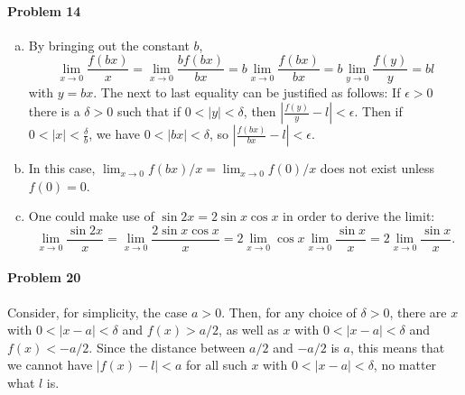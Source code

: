 \documentclass{article}
\begin{document}
\paragraph{Problem 14}
\begin{enumerate}[(a)]
  \item By bringing out the constant $b$, \[
      \lim_{x \to 0} \frac{f(bx)}{x}
      = \lim_{x \to 0} \frac{bf(bx)}{bx}
      = b \lim_{x \to 0} \frac{f(bx)}{bx}
      = b \lim_{y \to 0} \frac{f(y)}{y}
      = bl
    \] with $y = bx$. The next to last equality can be justified as follows: If
    $\epsilon > 0$ there is a $\delta > 0$ such that if $0 < |y| < \delta$,
    then $\left| \frac{f(y)}{y} - l \right| < \epsilon$. Then if $0 < |x| <
    \frac{\delta}{b}$, we have $0 < |bx| < \delta$, so $\left| \frac{f(bx)}{bx}
    - l \right| < \epsilon$.
  \item In this case, $\lim_{x \to 0} f(bx)/x = \lim_{x \to 0} f(0)/x$ does not
    exist unless $f(0) = 0$.
  \item One could make use of $\sin{2x} = 2\sin{x}\cos{x}$ in order to derive
    the limit: \[
      \lim_{x \to 0} \frac{\sin 2x}{x}
      = \lim_{x \to 0} \frac{2 \sin x \cos x}{x}
      = 2\lim_{x \to 0} \cos x \lim_{x \to 0} \frac{\sin x}{x}
      = 2\lim_{x \to 0} \frac{\sin x}{x}.
    \]
\end{enumerate}

\paragraph{Problem 20} Consider, for simplicity, the case $a > 0$. Then, for
any choice of $\delta > 0$, there are $x$ with $0 < |x - a| < \delta$ and $f(x)
> a/2$, as well as $x$ with $0 < |x - a| < \delta$ and $f(x) < -a/2$. Since the
distance between $a/2$ and $-a/2$ is $a$, this means that we cannot have $|f(x)
- l| < a$ for all such $x$ with $0 < |x - a| < \delta$, no matter what $l$ is.
\end{document}
